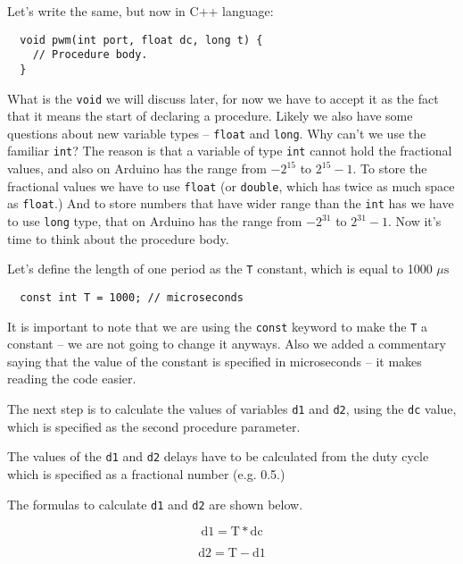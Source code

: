 \documentclass[../sparc.tex]{subfiles}
\begin{document}
Let's write the same, but now in C++ language:

\begin{verbatim}
  void pwm(int port, float dc, long t) {
    // Procedure body.
  }
\end{verbatim}

What is the \texttt{void} we will discuss later, for now we have to accept it as
the fact that it means the start of declaring a procedure.  Likely we also have
some questions about new variable types -- \texttt{float} and \texttt{long}.  Why
can't we use the familiar \texttt{int}?  The reason is that a variable of type
\texttt{int} cannot hold the fractional values, and also on Arduino has the
range from $-2^{15}$ to $2^{15} - 1$.  To store the fractional values we have to
use \texttt{float} (or \texttt{double}, which has twice as much space as
\texttt{float}.)  And to store numbers that have wider range than the
\texttt{int} has we have to use \texttt{long} type, that on Arduino has the
range from $-2^{31}$ to $2^{31} - 1$.  Now it's time to think about the
procedure body.

Let's define the length of one period as the \texttt{T} constant, which is equal
to 1000 $\mu\mbox{s}$

\begin{verbatim}
  const int T = 1000; // microseconds
\end{verbatim}

It is important to note that we are using the \texttt{const} keyword to make the
\texttt{T} a constant -- we are not going to change it anyways.  Also we added a
commentary saying that the value of the constant is specified in microseconds --
it makes reading the code easier.

The next step is to calculate the values of variables \texttt{d1} and
\texttt{d2}, using the \texttt{dc} value, which is specified as the second
procedure parameter.

The values of the \texttt{d1} and \texttt{d2} delays have to be calculated from
the duty cycle which is specified as a fractional number (e.g. 0.5.)

The formulas to calculate \texttt{d1} and \texttt{d2} are shown below.

\begin{equation}
  \mbox{d1} = \mbox{T} * \mbox{dc}
  \label{A formula to calculate the time of ``HIGH'' value.}
\end{equation}

\begin{equation}
  \mbox{d2} = \mbox{T} - \mbox{d1}
  \label{A formula to calculate the time of ``LOW value.}
\end{equation}
\end{document}
